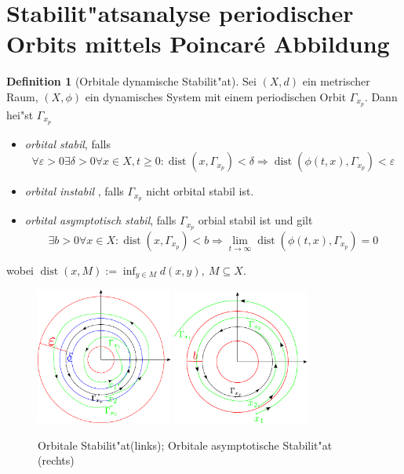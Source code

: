 \documentclass[a4paper, 13pt]{scrreprt}
\theoremstyle{definition} \newtheorem{definition}{Definition}[section]
\begin{document}
\section{Stabilit"atsanalyse periodischer Orbits mittels Poincar\'{e} Abbildung}
\begin{definition}[Orbitale dynamische Stabilit"at]
Sei $(X,d)$ ein metrischer Raum, $(X,\phi)$ ein dynamisches System mit einem periodischen Orbit $\Gamma_{x_p}$. Dann hei"st $\Gamma_{x_p}$ 
\begin{itemize}
\item \emph{orbital stabil}, falls 
	$$ \forall \varepsilon > 0 \exists \delta > 0 \forall x\in X, t\geq 0:
	\operatorname{dist}(x, \Gamma_{x_p}) < \delta \Rightarrow \operatorname{dist}(\phi(t,x), \Gamma_{x_p}) < \varepsilon$$
\item \emph{orbital instabil }, falls $\Gamma_{x_p}$ nicht orbital stabil ist.
\item \emph{orbital asymptotisch stabil}, falls $\Gamma_{x_p}$ orbial stabil ist und gilt
$$ \exists b > 0 \forall x \in X: \operatorname{dist}(x, \Gamma_{x_p}) < b \Rightarrow \lim_{t\to\infty}{\operatorname{dist}(\phi(t,x), \Gamma_{x_p})} = 0 $$
\end{itemize}
wobei $\operatorname{dist}(x, M) := \inf_{y\in M}{d(x,y)}, \ M\subseteq X$.
\end{definition}
\begin{figure}[htpb]
		\centering
		\includegraphics[width=0.4\textwidth]{img/periodische_orbits/orbiale_stabilitaet.pdf}
		\includegraphics[width=0.4\textwidth]{img/periodische_orbits/orbitale_asymp_stabilitaet.pdf}
		\caption{Orbitale Stabilit"at(links); Orbitale asymptotische Stabilit"at (rechts)}
\end{figure}
\end{document}
